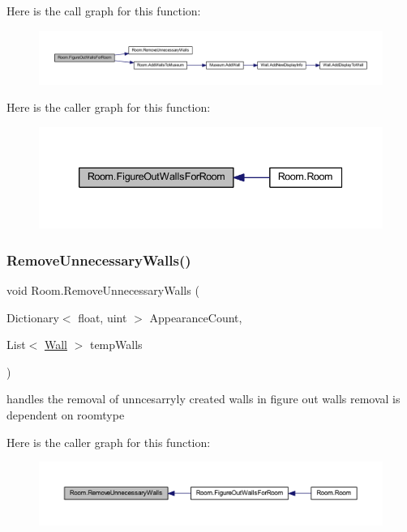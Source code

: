 Here is the call graph for this function\+:
\nopagebreak
\begin{figure}[H]
\begin{center}
\leavevmode
\includegraphics[width=350pt]{class_room_aade4dd11dfe01508688d382a49d7c606_cgraph}
\end{center}
\end{figure}
Here is the caller graph for this function\+:
\nopagebreak
\begin{figure}[H]
\begin{center}
\leavevmode
\includegraphics[width=339pt]{class_room_aade4dd11dfe01508688d382a49d7c606_icgraph}
\end{center}
\end{figure}
\mbox{\label{class_room_ae3ade89041403549ba23b6d373e62391}} 
\subsubsection{\texorpdfstring{Remove\+Unnecessary\+Walls()}{RemoveUnnecessaryWalls()}}
{\footnotesize\ttfamily void Room.\+Remove\+Unnecessary\+Walls (\begin{DoxyParamCaption}\item[{Dictionary$<$ float, uint $>$}]{Appearance\+Count,  }\item[{List$<$ \mbox{\hyperlink{class_wall}{Wall}} $>$}]{temp\+Walls }\end{DoxyParamCaption})\hspace{0.3cm}{\ttfamily [private]}}



handles the removal of unncesarryly created walls in figure out walls removal is dependent on roomtype 

Here is the caller graph for this function\+:
\nopagebreak
\begin{figure}[H]
\begin{center}
\leavevmode
\includegraphics[width=350pt]{class_room_ae3ade89041403549ba23b6d373e62391_icgraph}
\end{center}
\end{figure}


